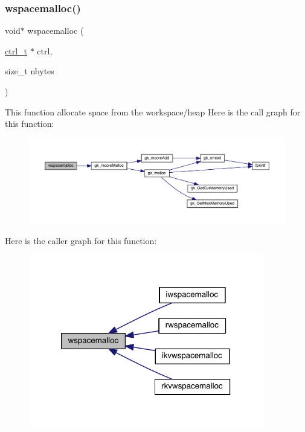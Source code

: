\subsubsection{\texorpdfstring{wspacemalloc()}{wspacemalloc()}}
{\footnotesize\ttfamily void$\ast$ wspacemalloc (\begin{DoxyParamCaption}\item[{\hyperlink{a00742}{ctrl\+\_\+t} $\ast$}]{ctrl,  }\item[{size\+\_\+t}]{nbytes }\end{DoxyParamCaption})}

This function allocate space from the workspace/heap Here is the call graph for this function\+:\nopagebreak
\begin{figure}[H]
\begin{center}
\leavevmode
\includegraphics[width=350pt]{a00951_a555f2ae3f4e5561c9b1ef592bf0f8476_cgraph}
\end{center}
\end{figure}
Here is the caller graph for this function\+:\nopagebreak
\begin{figure}[H]
\begin{center}
\leavevmode
\includegraphics[width=290pt]{a00951_a555f2ae3f4e5561c9b1ef592bf0f8476_icgraph}
\end{center}
\end{figure}
